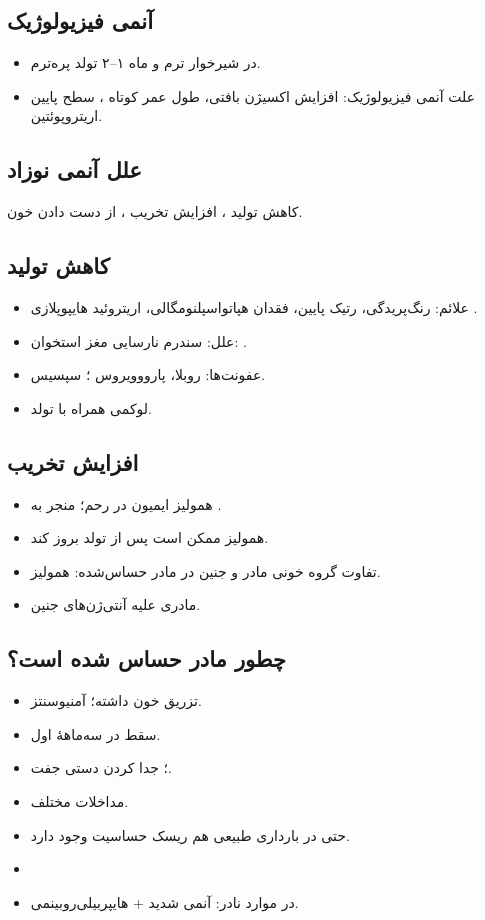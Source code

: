 \documentclass[12pt,a4paper]{article}
\begin{document}
\subsection*{آنمی فیزیولوژیک}
\begin{itemize}
\item در  شیرخوار ترم و ماه ۱–۲ تولد پره‌ترم.
\item علت آنمی فیزیولوژیک: افزایش اکسیژن بافتی، طول عمر کوتاه ،
سطح پایین اریتروپوئتین.
\end{itemize}

\subsection*{علل آنمی نوزاد}
کاهش تولید ، افزایش تخریب ، از دست دادن خون.
\subsection*{کاهش تولید }
\begin{itemize}
\item علائم: رنگ‌پریدگی، رتیک پایین، فقدان هپاتواسپلنومگالی، اریتروئید هایپوپلازی .
\item علل: سندرم نارسایی مغز استخوان:
.
\item عفونت‌ها: روبلا، پارووویروس ؛ سپسیس.
\item لوکمی همراه با تولد.
\end{itemize}
\subsection*{افزایش تخریب }
\begin{itemize}
\item همولیز ایمیون در رحم؛ منجر به .
\item همولیز ممکن است پس از تولد بروز کند.
\item تفاوت گروه خونی مادر و جنین در مادر حساس‌شده: همولیز.
\item {} مادری علیه آنتی‌ژن‌های  جنین.
\end{itemize}
\subsection*{چطور مادر حساس شده است؟}
\begin{itemize}
\item تزریق خون داشته؛ آمنیوسنتز.
\item سقط در سه‌ماههٔ اول.
\item {}؛ جدا کردن دستی جفت.
\item مداخلات مختلف.
\item حتی در بارداری طبیعی هم ریسک حساسیت وجود دارد.
\end{itemize}
\begin{itemize}
\item {}
\item {} در موارد نادر:
آنمی شدید + هایپربیلی‌روبینمی.
\end{itemize}
\end{document}
